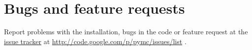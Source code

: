 
\hypertarget{bugs-and-feature-requests}{}
\section*{Bugs and feature requests}

Report problems with the installation, bugs in the code or feature request at 
the \href{http://code.google.com/p/pymc/issues/list.}{issue tracker} at \href{http://code.google.com/p/pymc/issues/list}{http://code.google.com/p/pymc/issues/list} .

